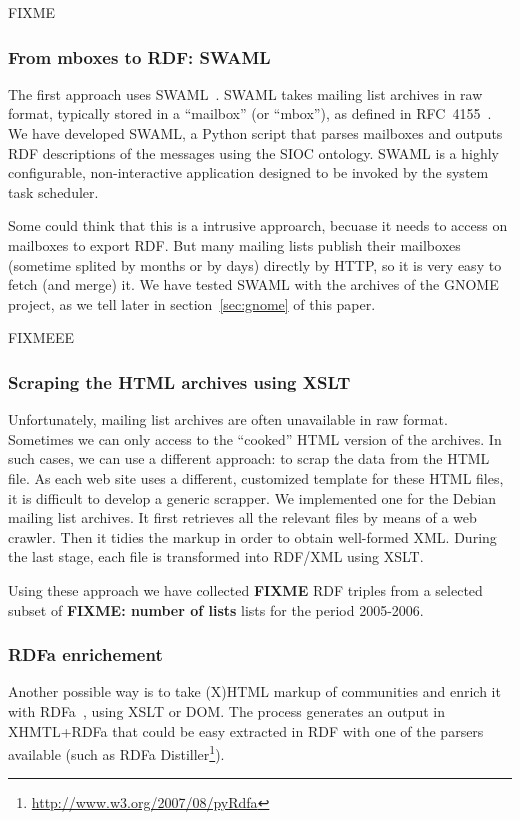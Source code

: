 \documentclass{../templates/www2008-submission}
\begin{document}
FIXME

\subsubsection{From mboxes to RDF: SWAML}

The first approach uses SWAML~\cite{SWAML2007}. SWAML takes mailing 
list archives in raw format, typically stored in a ``mailbox'' 
(or ``mbox''), as defined in RFC~4155~\cite{RFC4155}. We have 
developed SWAML, a Python script that parses mailboxes and 
outputs RDF descriptions of the messages using the SIOC ontology.
SWAML is a highly configurable, non-interactive application designed 
to be invoked by the system task scheduler.

Some could think that this is a intrusive approarch, becuase it needs
to access on mailboxes to export RDF. But many mailing lists publish
their mailboxes (sometime splited by months or by days) directly by 
HTTP, so it is very easy to fetch (and merge) it. We have tested SWAML 
with the archives of the GNOME project, as we tell later in 
section~\ref{sec:gnome} of this paper. 

FIXMEEE	

\subsubsection{Scraping the HTML archives using XSLT}

Unfortunately, mailing list archives are often unavailable in raw
format. Sometimes we can only access to the ``cooked'' HTML
version of the archives. In such cases, we can use a different
approach: to scrap the data from the HTML file. As each web site
uses a different, customized template for these HTML files, it is
difficult to develop a generic scrapper. We implemented one
for the Debian mailing list archives. It first retrieves all
the relevant files by means of a web crawler. Then it tidies the
markup in order to obtain well-formed XML. During the last stage,
each file is transformed into RDF/XML using XSLT.

Using these approach we have collected \textbf{FIXME} RDF triples
from a selected subset of \textbf{FIXME: number of lists} lists for
the period 2005-2006.

\subsubsection{RDFa enrichement}

Another possible way is to take (X)HTML markup of communities and
enrich it with RDFa~\cite{Birbeck2006}, using XSLT or DOM. The process
generates an output in XHMTL+RDFa that could be easy extracted in RDF 
with one of the parsers available (such as RDFa Distiller\footnote{\url{http://www.w3.org/2007/08/pyRdfa}}).
\end{document}
